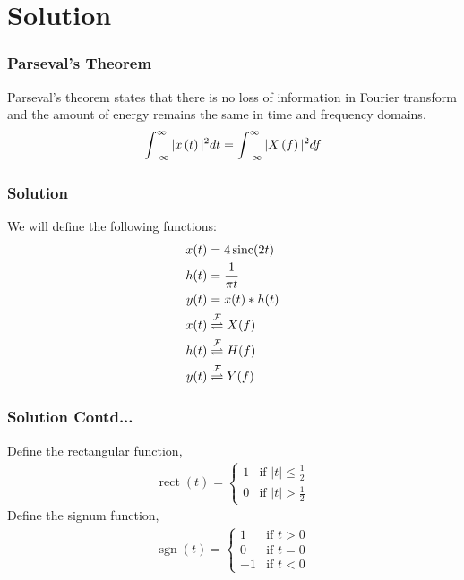 \documentclass{beamer}
\newcommand{\sgn}{\mathop{\mathrm{sgn}}}
\DeclareMathOperator{\sinc}{sinc}
\DeclareMathOperator{\rect}{rect}
\begin{document}
\section*{Solution}
\begin{frame}[fragile]
\frametitle{Parseval's Theorem}
\begin{flushleft}
Parseval's theorem states that there is no loss of information in Fourier transform and the amount of energy remains the same in time and frequency domains.
\begin{align}
    \int_{-\infty}^{\infty} |x\left(t\right)|^{2} dt = \int_{-\infty}^{\infty} |X\left(f\right)|^{2} df
\end{align}
\end{flushleft}
\end{frame}
\begin{frame}[fragile]
\frametitle{Solution}
\begin{flushleft}
We will define the following functions:
\begin{align}
    x(t) &= 4\sinc(2t)\\
    h(t) &= \frac{1}{\pi t}\\
    y(t) &= x(t) * h(t) \label{eq:1}\\
    x(t) &\fourier{X(f)}\\
    h(t) &\fourier{H(f)}\\
    y(t) &\fourier{Y(f)}
\end{align}
\end{flushleft}
\end{frame}
\begin{frame}[fragile]
\frametitle{Solution Contd...}
\begin{flushleft}
Define the rectangular function,
\begin{align}
    \rect(t) =
    \begin{cases}
    1 & \text{if } |t| \leq \frac{1}{2}\\
    0 & \text{if } |t| > \frac{1}{2}
    \end{cases}
\end{align}
Define the signum function,
\begin{align}
    \sgn(t) =
    \begin{cases}
    1 & \text{if } t > 0\\
    0 & \text{if } t = 0\\
    -1 & \text{if } t < 0
    \end{cases}
\end{align}
\end{flushleft}
\end{frame}
\end{document}
